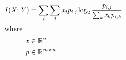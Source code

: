 \documentclass[12pt]{article}
\begin{document}
\begin{center}
\resizebox{\textwidth}{!} 
{
\begin{minipage}[c]{\textwidth}
\begin{align*}
\mathit{I(X;Y)} & = \sum_\mathit{i} \sum_\mathit{j} \mathit{x}_{ \mathit{j} }\mathit{p}_{\mathit{i}, \mathit{j}} \log_2{ \frac{\mathit{p}_{\mathit{i}, \mathit{j}}}{\sum_\mathit{k} \mathit{x}_{ \mathit{k} }\mathit{p}_{\mathit{i}, \mathit{k}}} } \\
\intertext{where} 
\mathit{x} & \in \mathbb{R}^{ \mathit{n}} \\
\mathit{p} & \in \mathbb{R}^{ \mathit{m} \times \mathit{n} } \\
\\
\end{align*}
\end{minipage}
}
\end{center}
\end{document}
